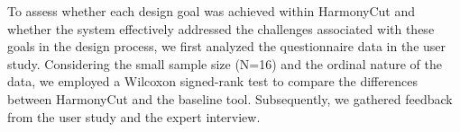 To assess whether each design goal was achieved within HarmonyCut and whether the system effectively addressed the challenges associated with these goals in the design process, we first analyzed the questionnaire data in the user study. Considering the small sample size (N=16) and the ordinal nature of the data, we employed a Wilcoxon signed-rank test to compare the differences between HarmonyCut and the baseline tool.  Subsequently, we gathered feedback from the user study and the expert interview.


